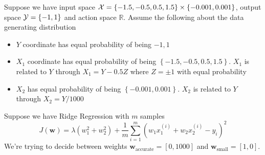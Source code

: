 \documentclass[addpoints,12pt,answers]{exam}
\begin{document}
\begin{questions}
 Suppose we have input space $\mathcal{X}=\left\{-1.5,-0.5,0.5,1.5 \right\} \times \left\{ -0.001, 0.001 \right\}$, output space $\mathcal{Y} =  \left\{ -1, 1 \right\}$ and action space $\mathbb{R}$. Assume the following about the data generating distribution 
\begin{itemize}
    \item $Y$ coordinate has equal probability of being $-1,1$
    \item $X_1$ coordinate has equal probability of being $\left\{-1.5,-0.5,0.5,1.5 \right\}$. $X_1$ is related to $Y$ through $X_1 = Y - 0.5 Z$ where $Z = \pm 1$ with equal probability
    \item $X_2$ has equal probability of being $\left\{-0.001,0.001 \right\}$. $X_2$ is related to $Y$ through $X_2 = Y / 1000$
\end{itemize}
Suppose we have Ridge Regression with $m$ samples 
\[
J(\mathbf{w})=\lambda(w_{1}^{2}+w_{2}^{2}) + \frac{1}{m}\sum_{i=1}^{m}\left(w_{1}x^{(i)}_{1}+w_{2}x^{(i)}_{2}-y_{i}\right)^{2}
\]
We're trying to decide between weights $\mathbf{w}_{\operatorname{accurate}} = \left[0, 1000\right]$ and $\mathbf{w}_{\operatorname{small}} = \left[1, 0\right]$. 
\end{questions}
\end{document}

